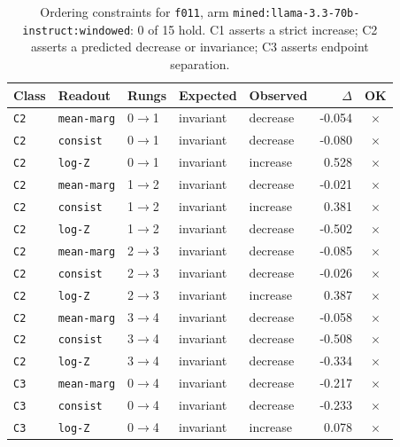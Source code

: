 \documentclass[11pt]{article}
\begin{document}
\begin{table}[htbp]
\centering
\small
\caption{Ordering constraints for \texttt{f011}, arm \texttt{mined:llama-3.3-70b-instruct:windowed}: 0 of 15 hold. C1 asserts a strict increase; C2 asserts a predicted decrease or invariance; C3 asserts endpoint separation.}
\label{tab:ladder-f011-mined-llama-3-3-70b-instruct-windowed}
\begin{tabular}{lllllrc}
\toprule
Class & Readout & Rungs & Expected & Observed & $\Delta$ & OK \\
\midrule
\texttt{C2} & \texttt{mean-marg} & 0$\to$1 & invariant & decrease & -0.054 & $\times$ \\
\texttt{C2} & \texttt{consist} & 0$\to$1 & invariant & decrease & -0.080 & $\times$ \\
\texttt{C2} & \texttt{log-Z} & 0$\to$1 & invariant & increase & 0.528 & $\times$ \\
\texttt{C2} & \texttt{mean-marg} & 1$\to$2 & invariant & decrease & -0.021 & $\times$ \\
\texttt{C2} & \texttt{consist} & 1$\to$2 & invariant & increase & 0.381 & $\times$ \\
\texttt{C2} & \texttt{log-Z} & 1$\to$2 & invariant & decrease & -0.502 & $\times$ \\
\texttt{C2} & \texttt{mean-marg} & 2$\to$3 & invariant & decrease & -0.085 & $\times$ \\
\texttt{C2} & \texttt{consist} & 2$\to$3 & invariant & decrease & -0.026 & $\times$ \\
\texttt{C2} & \texttt{log-Z} & 2$\to$3 & invariant & increase & 0.387 & $\times$ \\
\texttt{C2} & \texttt{mean-marg} & 3$\to$4 & invariant & decrease & -0.058 & $\times$ \\
\texttt{C2} & \texttt{consist} & 3$\to$4 & invariant & decrease & -0.508 & $\times$ \\
\texttt{C2} & \texttt{log-Z} & 3$\to$4 & invariant & decrease & -0.334 & $\times$ \\
\texttt{C3} & \texttt{mean-marg} & 0$\to$4 & invariant & decrease & -0.217 & $\times$ \\
\texttt{C3} & \texttt{consist} & 0$\to$4 & invariant & decrease & -0.233 & $\times$ \\
\texttt{C3} & \texttt{log-Z} & 0$\to$4 & invariant & increase & 0.078 & $\times$ \\
\bottomrule
\end{tabular}
\end{table}
\end{document}
